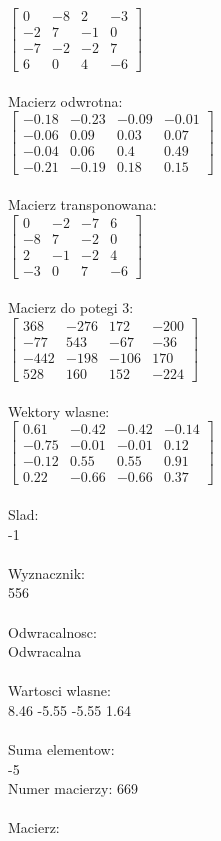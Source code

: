 \documentclass[a4paper,12pt]{article}
\begin{document}
$\begin{bmatrix} 0&-8&2&-3\\-2&7&-1&0\\-7&-2&-2&7\\6&0&4&-6 \end{bmatrix}$
\\
\\
Macierz odwrotna:\\

$\begin{bmatrix} -0.18&-0.23&-0.09&-0.01\\-0.06&0.09&0.03&0.07\\-0.04&0.06&0.4&0.49\\-0.21&-0.19&0.18&0.15 \end{bmatrix}$
\\
\\
Macierz transponowana:\\

$\begin{bmatrix} 0&-2&-7&6\\-8&7&-2&0\\2&-1&-2&4\\-3&0&7&-6 \end{bmatrix}$
\\
\\
Macierz do potegi 3:\\

$\begin{bmatrix} 368&-276&172&-200\\-77&543&-67&-36\\-442&-198&-106&170\\528&160&152&-224 \end{bmatrix}$
\\
\\
Wektory wlasne:\\

$\begin{bmatrix} 0.61&-0.42&-0.42&-0.14\\-0.75&-0.01&-0.01&0.12\\-0.12&0.55&0.55&0.91\\0.22&-0.66&-0.66&0.37 \end{bmatrix}$
\\
\\
Slad:\\
-1
\\
\\
Wyznacznik:\\
556
\\
\\
Odwracalnosc:\\
Odwracalna
\\
\\
Wartosci wlasne:\\
8.46 -5.55 -5.55 1.64
\\
\\
Suma elementow:\\
-5
\\
\newpage
Numer macierzy:
669
\\
\\
Macierz:\\
\end{document}
